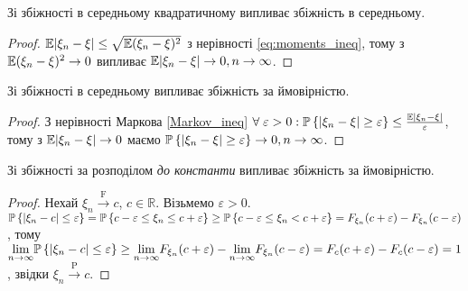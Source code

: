 \begin{proposition*} 
    Зі збіжності в середньому квадратичному випливає збіжність в середньому.
\end{proposition*}
\begin{proof}
    $\E|\xi_n -\xi| \leq \sqrt{\E(\xi_n - \xi)^2}$ з нерівності \eqref{eq:moments_ineq}, тому з $\E(\xi_n - \xi)^2 \to 0$
    випливає $\E|\xi_n - \xi| \to 0, n\to\infty$.
\end{proof}
\begin{proposition*}
    Зі збіжності в середньому випливає збіжність за ймовірністю.
\end{proposition*}
\begin{proof}
    З нерівності Маркова \eqref{Markov_ineq}
    $\forall \; \varepsilon > 0: \P\left\{|\xi_n - \xi| \geq \varepsilon\right\} \leq \frac{\E|\xi_n - \xi|}{\varepsilon}$, 
    тому з $\E|\xi_n - \xi| \to 0$ маємо $\P\left\{|\xi_n - \xi| \geq \varepsilon\right\} \to 0, n\to\infty$.
\end{proof}
\begin{proposition*}
     Зі збіжності за розподілом \emph{до константи} випливає збіжність за ймовірністю.
\end{proposition*}
\begin{proof}
    Нехай $\xi_n \overset{\mathrm{F}}{\longrightarrow} c$, $c \in \mathbb{R}$. Візьмемо $\varepsilon > 0$.
    $\P\left\{ |\xi_n - c| \leq \varepsilon\right\} = \P\left\{ c - \varepsilon \leq \xi_n \leq c + \varepsilon \right\} \geq
    \P\left\{ c - \varepsilon \leq \xi_n < c + \varepsilon \right\} = F_{\xi_n}(c+\varepsilon) - F_{\xi_n}(c-\varepsilon)$, тому
    $\underset{n \to \infty}{\lim} \P\left\{ |\xi_n - c| \leq \varepsilon\right\} \geq \underset{n \to \infty}{\lim}  F_{\xi_n}(c+\varepsilon) -
    \underset{n \to \infty}{\lim}  F_{\xi_n}(c-\varepsilon) = F_c(c+\varepsilon) - F_c(c-\varepsilon) = 1$, звідки $\xi_n \overset{\mathrm{P}}{\longrightarrow} c$.
\end{proof}
